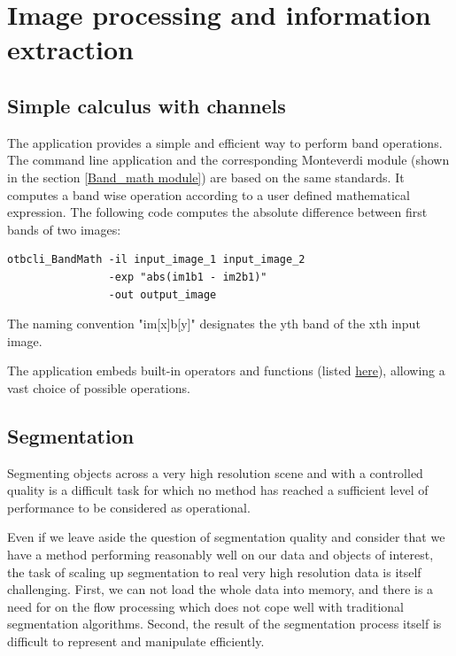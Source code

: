 \section{Image processing and information extraction}\label{sec:improc}

\subsection{Simple calculus with channels}\label{ssec:calculus}

The  application provides a simple and efficient
way to perform band operations. The command line application and the
corresponding Monteverdi module (shown in the section \ref{Band_math module})
are based on the same standards. It computes a band wise operation according
to a user defined mathematical expression. The following code computes the
absolute difference between first bands of two images:

\begin{verbatim}
otbcli_BandMath -il input_image_1 input_image_2
                -exp "abs(im1b1 - im2b1)"
                -out output_image
\end{verbatim}

The naming convention "im[x]b[y]" designates the yth band of the xth input image.

The  application embeds built-in operators and functions
(listed \href{http://muparser.sourceforge.net/mup_features.html#idDef2}{here}),
allowing a vast choice of possible operations.

\subsection{Segmentation}\label{ssec:segmentation}

Segmenting objects across a very high resolution scene and with a controlled
quality is a difficult task for which no method has reached a sufficient level
of performance to be considered as operational.

Even if we leave aside the question of segmentation quality and
consider that we have a method performing reasonably well on our data
and objects of interest, the task of scaling up segmentation to real
very high resolution data is itself challenging. First, we can not
load the whole data into memory, and there is a need for on the flow
processing which does not cope well with traditional segmentation
algorithms. Second, the result of the segmentation process
itself is difficult to represent and manipulate efficiently.


